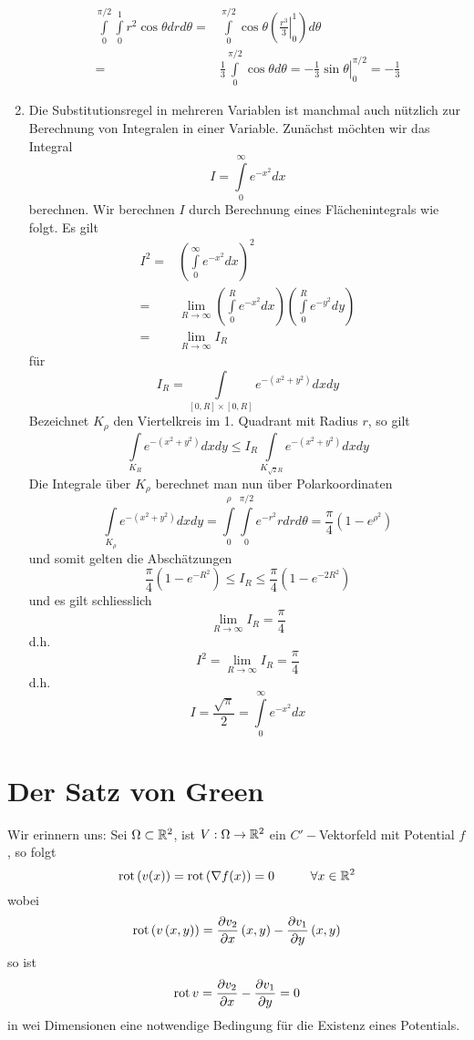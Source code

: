 \begin{enumerate}
\begin{align*}
\int\limits_0^{\pi /2} {\int\limits_0^1 {{r^2}\cos \theta drd\theta } }  =&\int\limits_0^{\pi /2} {\cos \theta \left( {\left. {\frac{{{r^3}}}{3}} \right|_0^1} \right)d\theta } \\
 =&\frac{1}{3}\int\limits_0^{\pi /2} {\cos \theta d\theta }  = \left. { - \frac{1}{3}\sin \theta } \right|_0^{\pi /2} =  - \frac{1}{3}
\end{align*}
\item Die Substitutionsregel in mehreren Variablen ist manchmal auch nützlich zur Berechnung von Integralen in einer Variable. Zunächst möchten wir das Integral \[ I=\int\limits_0^\infty e^{-x^2} dx\] berechnen. Wir berechnen $I$ durch Berechnung eines Flächenintegrals wie folgt. Es gilt
\begin{align*}
{I^2} =&{\left( {\int\limits_0^\infty  {{e^{ - {x^2}}}dx} } \right)^2}\\
 =&\mathop {\lim }\limits_{R \to \infty } \left( {\int\limits_0^R {{e^{ - {x^2}}}dx} } \right)\left( {\int\limits_0^R {{e^{ - {y^2}}}dy} } \right)\\
 =&\mathop {\lim }\limits_{R \to \infty } {I_R}
\end{align*}
für \[{I_R} = \int\limits_{\left[ {0,R} \right] \times \left[ {0,R} \right]} {{e^{ - \left( {{x^2} + {y^2}} \right)}}dxdy} \]
Bezeichnet $K_\rho$ den Viertelkreis im 1. Quadrant mit Radius $r$, so gilt
\[\int\limits_{{K_R}} {{e^{ - \left( {{x^2} + {y^2}} \right)}}dxdy \le {I_R}\int\limits_{{K_{\sqrt 2 R}}} {{e^{ - \left( {{x^2} + {y^2}} \right)}}dxdy} } \]
Die Integrale über $K_\rho$ berechnet man nun über Polarkoordinaten
\[\int\limits_{{K_\rho }} {{e^{ - \left( {{x^2} + {y^2}} \right)}}dxdy}  = \int\limits_0^\rho  {\int\limits_0^{\pi /2} {{e^{ - {r^2}}}rdrd\theta } }  = \frac{\pi }{4}\left( {1 - {e^{{\rho ^2}}}} \right)\]
und somit gelten die Abschätzungen
\[\frac{\pi }{4}\left( {1 - {e^{ - {R^2}}}} \right) \le {I_R} \le \frac{\pi }{4}\left( {1 - {e^{ - 2{R^2}}}} \right)\]
und es gilt schliesslich
\[\mathop {\lim }\limits_{R \to \infty } {I_R} = \frac{\pi }{4}\]
d.h. \[{I^2} = \mathop {\lim }\limits_{R \to \infty } {I_R} = \frac{\pi }{4}\]
d.h. \[I = \frac{{\sqrt \pi  }}{2} = \int\limits_0^\infty  {{e^{ - {x^2}}}dx} \]
\end{enumerate}

\section{Der Satz von Green}
Wir erinnern uns: Sei $\Omega\subset\mathbb{R}^2$, ist $V:\Omega\to\mathbb{R}^2$ ein $C'-$Vektorfeld mit Potential $f$, so folgt
\[\rot\left( v(x)\right)=\rot\left( \nabla f(x)\right)=0\hspace{10mm}\forall x\in\R^2 \]
wobei
\[\operatorname{rot}\left( v\left( x,y\right)\right)=\frac{\partial v_2}{\partial x}\left( x,y\right) -\frac{\partial v_1}{\partial y}\left( x,y\right)\]
so ist
\[\operatorname{rot} v=\frac{\partial v_2}{\partial x} -\frac{\partial v_1}{\partial y}=0 \]
in wei Dimensionen eine notwendige Bedingung für die Existenz eines Potentials.\\

